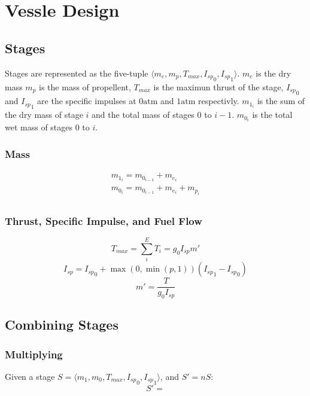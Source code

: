 \section{Vessle Design}
\subsection{Stages}
Stages are represented as the five-tuple $\langle m_e, m_p, T_{max}, {I_{sp}}_0, {I_{sp}}_1 \rangle$. $m_e$ is the dry mass
$m_p$ is the mass of propellent, $T_{max}$ is the maximun thrust of the stage, ${I_{sp}}_0$ and ${I_{sp}}_1$ are the specific impulses at
$0\mathrm{atm}$ and $1\mathrm{atm}$ respectivly. $m_{1_i}$ is the sum of the dry mass of stage $i$ and the total mass of stages 0 to $i-1$.
$m_{0_i}$ is the total wet mass of stages 0 to $i$.
\subsubsection{Mass}
\begin{equation}
    \label{stage_mass}
    \begin{array}{c}
        m_{1_i} = m_{0_{i-1}} + m_{e_{i}} \\
        m_{0_i} = m_{0_{i-1}} + m_{e_{i}} + m_{p_{i}} \\
    \end{array}
\end{equation}
\subsubsection{Thrust, Specific Impulse, and Fuel Flow}
\begin{equation}
    \label{stage_thrust_max}
    T_{max} = \sum^{E}_{i}{T_{i}} = g_{0}I_{sp}m'
\end{equation}
\begin{equation}
    \label{stage_isp}
    I_{sp} = {I_{sp}}_{0}+\max\left(0,\min\left(p,1\right)\right)\left({I_{sp}}_{1} - {I_{sp}}_{0}\right)
\end{equation}
\begin{equation}
    \label{stage_ff}
    m' = \frac{T}{g_{0}I_{sp}}
\end{equation}
\subsection{Combining Stages}
\subsubsection{Multiplying}
Given a stage $S = \langle m_1, m_0, T_{max}, {I_{sp}}_0, {I_{sp}}_1 \rangle$, and $S' = nS$:
\begin{equation}
    S' = 
\end{equation} 

